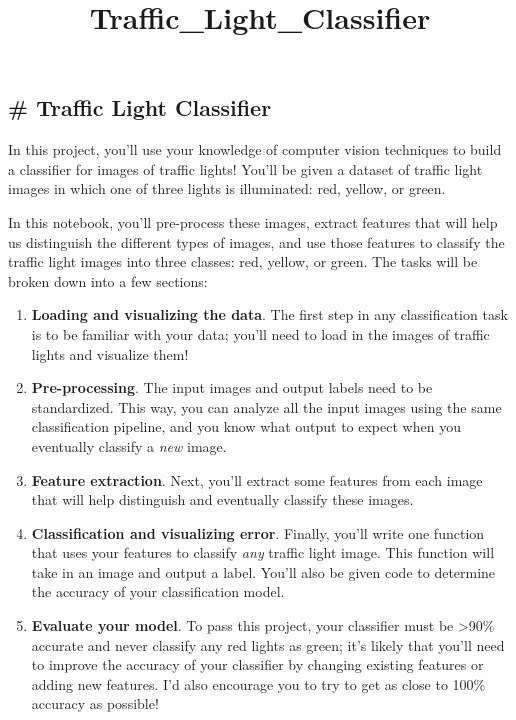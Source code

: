 \documentclass[11pt]{article}
\title{Traffic\_Light\_Classifier}
\begin{document}
    
    
    \maketitle
    
    

    
    \hypertarget{traffic-light-classifier}{%
\subsection{\# Traffic Light
Classifier}\label{traffic-light-classifier}}

In this project, you'll use your knowledge of computer vision techniques
to build a classifier for images of traffic lights! You'll be given a
dataset of traffic light images in which one of three lights is
illuminated: red, yellow, or green.

In this notebook, you'll pre-process these images, extract features that
will help us distinguish the different types of images, and use those
features to classify the traffic light images into three classes: red,
yellow, or green. The tasks will be broken down into a few sections:

\begin{enumerate}
\def\labelenumi{\arabic{enumi}.}
\item
  \textbf{Loading and visualizing the data}. The first step in any
  classification task is to be familiar with your data; you'll need to
  load in the images of traffic lights and visualize them!
\item
  \textbf{Pre-processing}. The input images and output labels need to be
  standardized. This way, you can analyze all the input images using the
  same classification pipeline, and you know what output to expect when
  you eventually classify a \emph{new} image.
\item
  \textbf{Feature extraction}. Next, you'll extract some features from
  each image that will help distinguish and eventually classify these
  images.
\item
  \textbf{Classification and visualizing error}. Finally, you'll write
  one function that uses your features to classify \emph{any} traffic
  light image. This function will take in an image and output a label.
  You'll also be given code to determine the accuracy of your
  classification model.
\item
  \textbf{Evaluate your model}. To pass this project, your classifier
  must be \textgreater{}90\% accurate and never classify any red lights
  as green; it's likely that you'll need to improve the accuracy of your
  classifier by changing existing features or adding new features. I'd
  also encourage you to try to get as close to 100\% accuracy as
  possible!
\end{enumerate}
\end{document}
